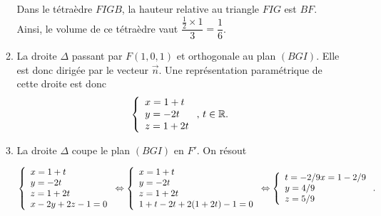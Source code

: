 \documentclass[11pt,fleqn, openany]{book} %
\begin{document}
\begin{solution}
\begin{enumerate}
\begin{enumerate}
\begin{center}
\end{center}
Dans le tétraèdre $FIGB$, la hauteur relative au triangle $FIG$ est $BF$. Ainsi, le volume de ce tétraèdre vaut $\dfrac{\frac{1}{2} \times 1}{3} = \dfrac{1}{6}$.

\vskip5pt
\item La droite $\Delta$ passant par $F(1,0,1)$ et orthogonale au plan $(BGI)$. Elle est donc dirigée par le vecteur $\vec n$. Une représentation paramétrique de cette droite est donc 
\[\left\{\renewcommand{\arraystretch}{1}\renewcommand{\arraystretch}{1}\begin{array}{l} x = 1 + t \\ y=-2t \\ z  = 1+2t\end{array}\right.,\,t\in\mathbb{R}.\]
\vskip5pt
\item La droite $\Delta$ coupe le plan $(BGI)$ en $F'$. On résout

\[\left\{\renewcommand{\arraystretch}{1}\renewcommand{\arraystretch}{1}\begin{array}{l} x = 1 + t \\ y=-2t \\ z  = 1+2t \\ x-2y+2z-1=0 \end{array}\right. \Leftrightarrow \left\{\renewcommand{\arraystretch}{1}\renewcommand{\arraystretch}{1}\begin{array}{l} x = 1 + t \\ y=-2t \\ z  = 1+2t \\ 1+t-2t+2(1+2t)-1=0 \end{array}\right. \Leftrightarrow \left\{\renewcommand{\arraystretch}{1}\renewcommand{\arraystretch}{1}\begin{array}{l}t=-2/9 x = 1 -2/9 \\ y=4/9 \\ z  = 5/9 \end{array}\right. .\]


\end{enumerate}
\end{enumerate}
\end{solution}
\end{document}
